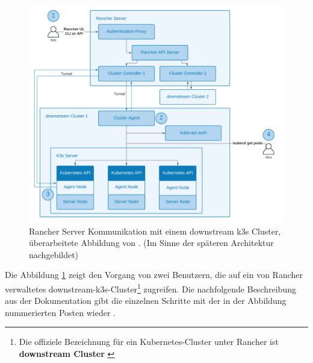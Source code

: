 \begin{figure}[!htb]
  \centering
  \includegraphics[width=0.8\columnwidth]{images/RancherArchitekturClusterController.png}
  \caption{Rancher Server Kommunikation mit einem downstream k3s Cluster, überarbeitete Abbildung von \cite{rancherArchitecture}. (Im Sinne der späteren Architektur nachgebildet)}
  \label{fig:rancherarchitektur}
\end{figure}

Die Abbildung \ref{fig:rancherarchitektur} zeigt den Vorgang von zwei Benutzern, 
die auf ein von Rancher verwaltetes downstream-k3s-Cluster\footnote{Die offiziele Bezeichnung für ein Kubernetes-Cluster unter Rancher ist \textbf{downstream Cluster} \cite{rancherArchitectureRecommendations}} zugreifen.
Die nachfolgende Beschreibung aus der Dokumentation gibt die einzelnen Schritte mit der in der Abbildung nummerierten Posten wieder \cite{rancherArchitecture}.


